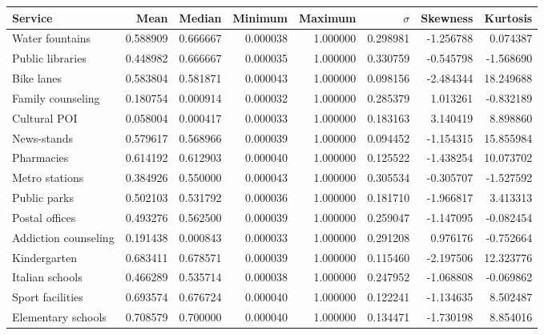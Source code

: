 \documentclass[12pt]{article}
\begin{document}
\begin{landscape}
	\begin{table}
		\centering
		\begin{tabular}{lrrrrrrr}
			\toprule
						  Service &        Mean &      Median &    Minimum &      Maximum &    $\sigma$ &  Skewness &   Kurtosis \\
			\midrule
				  Water fountains &    0.588909 &    0.666667 &   0.000038 &     1.000000 &    0.298981 & -1.256788 &   0.074387 \\
				 Public libraries &    0.448982 &    0.666667 &   0.000035 &     1.000000 &    0.330759 & -0.545798 &  -1.568690 \\
					   Bike lanes &    0.583804 &    0.581871 &   0.000043 &     1.000000 &    0.098156 & -2.484344 &  18.249688 \\
			   Family counseling &    0.180754 &    0.000914 &   0.000032 &     1.000000 &    0.285379 &  1.013261 &  -0.832189 \\
					 Cultural POI &    0.058004 &    0.000417 &   0.000033 &     1.000000 &    0.183163 &  3.140419 &   8.898860 \\
					  News-stands &    0.579617 &    0.568966 &   0.000039 &     1.000000 &    0.094452 & -1.154315 &  15.855984 \\
					   Pharmacies &    0.614192 &    0.612903 &   0.000040 &     1.000000 &    0.125522 & -1.438254 &  10.073702 \\
				   Metro stations &    0.384926 &    0.550000 &   0.000043 &     1.000000 &    0.305534 & -0.305707 &  -1.527592 \\
					 Public parks &    0.502103 &    0.531792 &   0.000036 &     1.000000 &    0.181710 & -1.966817 &   3.413313 \\
				   Postal offices &    0.493276 &    0.562500 &   0.000039 &     1.000000 &    0.259047 & -1.147095 &  -0.082454 \\
			Addiction counseling &    0.191438 &    0.000843 &   0.000033 &     1.000000 &    0.291208 &  0.976176 &  -0.752664 \\
					 Kindergarten &    0.683411 &    0.678571 &   0.000039 &     1.000000 &    0.115460 & -2.197506 &  12.323776 \\
				  Italian schools &    0.466289 &    0.535714 &   0.000038 &     1.000000 &    0.247952 & -1.068808 &  -0.069862 \\
				 Sport facilities &    0.693574 &    0.676724 &   0.000040 &     1.000000 &    0.122241 & -1.134635 &   8.502487 \\
			   Elementary schools &    0.708579 &    0.700000 &   0.000040 &     1.000000 &    0.134471 & -1.730198 &   8.854016 \\

\end{tabular}
\end{table}
\end{landscape}
\end{document}
